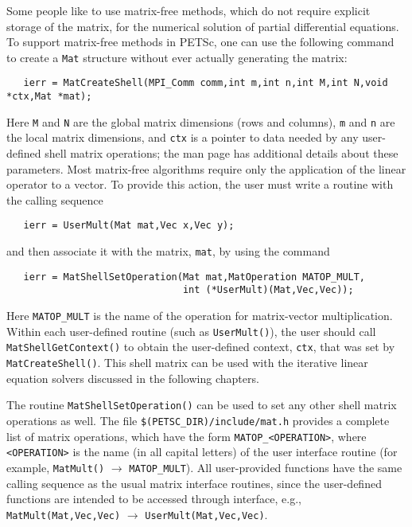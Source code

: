 \label{sec:matrixfree}
Some people like to use matrix-free methods, which do not require
explicit storage of the matrix, for the numerical solution of partial
differential equations.  To support matrix-free methods in PETSc, one
can use the following command to create a {\tt Mat} structure without
ever actually generating the matrix:
\begin{verbatim}
   ierr = MatCreateShell(MPI_Comm comm,int m,int n,int M,int N,void *ctx,Mat *mat);
\end{verbatim}
Here {\tt M} and {\tt N} are the global matrix dimensions (rows and
columns), {\tt m} and {\tt n} are the local matrix dimensions, and
{\tt ctx} is a pointer to data needed by any user-defined shell matrix
operations; the man page has additional details about these
parameters.  Most matrix-free algorithms require only the application
of the linear operator to a vector. To provide this action, the user
must write a routine with the calling sequence
\begin{verbatim}
   ierr = UserMult(Mat mat,Vec x,Vec y);
\end{verbatim}
and then associate it with the matrix, {\tt mat}, by using the 
command 
\begin{verbatim}
   ierr = MatShellSetOperation(Mat mat,MatOperation MATOP_MULT,
                               int (*UserMult)(Mat,Vec,Vec));
\end{verbatim}
Here {\tt MATOP\_MULT} is the name of the operation for matrix-vector
multiplication. Within each user-defined routine (such as
{\tt UserMult()}), the user should call 
{\tt MatShellGetContext()} to obtain the user-defined context, {\tt ctx},
that was set by {\tt MatCreateShell()}.
This shell matrix can be used with the iterative linear
equation solvers discussed in the following chapters.

The routine {\tt MatShellSetOperation()} can be used to set any other
shell matrix operations as well.  The file 
{\tt \$(PETSC\_DIR)/include/mat.h} provides a complete list of matrix
operations, which have the form {\tt MATOP\_<OPERATION>}, where {\tt
<OPERATION>} is the name (in all capital letters) of the user
interface routine (for example, {\tt MatMult()} $\rightarrow$ {\tt MATOP\_MULT}).  All
user-provided functions have the same calling sequence as the
usual matrix interface routines, since the user-defined functions are
intended to be accessed through interface, e.g., 
{\tt MatMult(Mat,Vec,Vec)} $\rightarrow$ {\tt UserMult(Mat,Vec,Vec)}.

